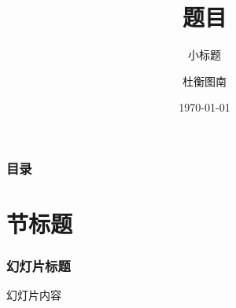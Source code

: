 \documentclass{beamer}
\title{题目}
\subtitle{小标题}
\author{杜衡图南}
\institute{学校名称}
\date{\today}
\begin{document}

\frame{\titlepage}



\begin{frame}

  \frametitle{目录}


  \tableofcontents

\end{frame}


\section{节标题}


\begin{frame}

  \frametitle{幻灯片标题}

  幻灯片内容

\end{frame}

\end{document}
